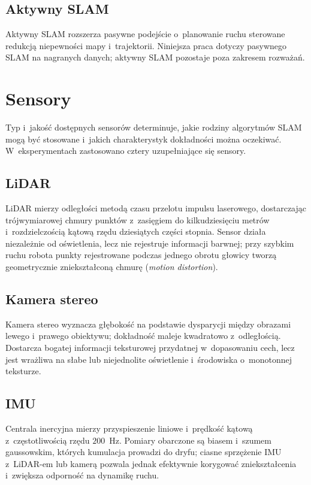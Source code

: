 \subsection{Aktywny SLAM}

Aktywny SLAM rozszerza pasywne podejście o~planowanie ruchu sterowane
redukcją niepewności mapy i~trajektorii.
Niniejsza praca dotyczy pasywnego SLAM na nagranych danych; aktywny SLAM
pozostaje poza zakresem rozważań.

\section{Sensory}

Typ i~jakość dostępnych sensorów determinuje, jakie rodziny algorytmów SLAM
mogą być stosowane i~jakich charakterystyk dokładności można oczekiwać.
W~eksperymentach zastosowano cztery uzupełniające się sensory.

\subsection{LiDAR}

LiDAR mierzy odległości metodą czasu przelotu impulsu laserowego,
dostarczając trójwymiarowej chmury punktów z~zasięgiem do kilkudziesięciu metrów
i~rozdzielczością kątową rzędu dziesiątych części stopnia.
Sensor działa niezależnie od oświetlenia, lecz nie rejestruje informacji
barwnej; przy szybkim ruchu robota punkty rejestrowane podczas jednego obrotu
głowicy tworzą geometrycznie zniekształconą chmurę (\textit{motion distortion}).

\subsection{Kamera stereo}

Kamera stereo wyznacza głębokość na podstawie dysparycji między obrazami
lewego i~prawego obiektywu; dokładność maleje kwadratowo z~odległością.
Dostarcza bogatej informacji teksturowej przydatnej w~dopasowaniu cech,
lecz jest wrażliwa na słabe lub niejednolite oświetlenie i~środowiska
o~monotonnej teksturze.

\subsection{IMU}

Centrala inercyjna mierzy przyspieszenie liniowe i~prędkość kątową
z~częstotliwością rzędu $200$~Hz.
Pomiary obarczone są biasem i~szumem gaussowskim, których kumulacja prowadzi
do dryfu; ciasne sprzężenie IMU z~LiDAR-em lub kamerą pozwala jednak
efektywnie korygować zniekształcenia i~zwiększa odporność na dynamikę ruchu.

